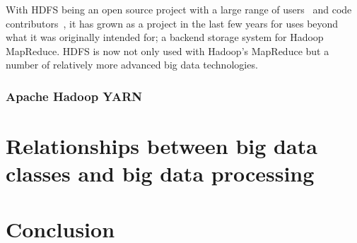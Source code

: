 \documentclass[a4paper,11pt]{article}
\begin{document}
With HDFS being an open source project with a large range of users~\cite{hadoop_users} and code
contributors~\cite{hadoop_committers}, it has grown as a project in the last few years for uses beyond what it was
originally intended for; a backend storage system for Hadoop MapReduce. HDFS is now not only used with Hadoop's
MapReduce but a number of relatively more advanced big data technologies.

\subsubsection{Apache Hadoop YARN} %
\label{ssub:apache_hadoop_yarn_}






\section{Relationships between big data classes and big data processing} %
\label{sec:relationships_between_big_data_classes_and_big_data_processing}



\section{Conclusion} %
\label{sec:conclusion}


\newpage



\end{document}
